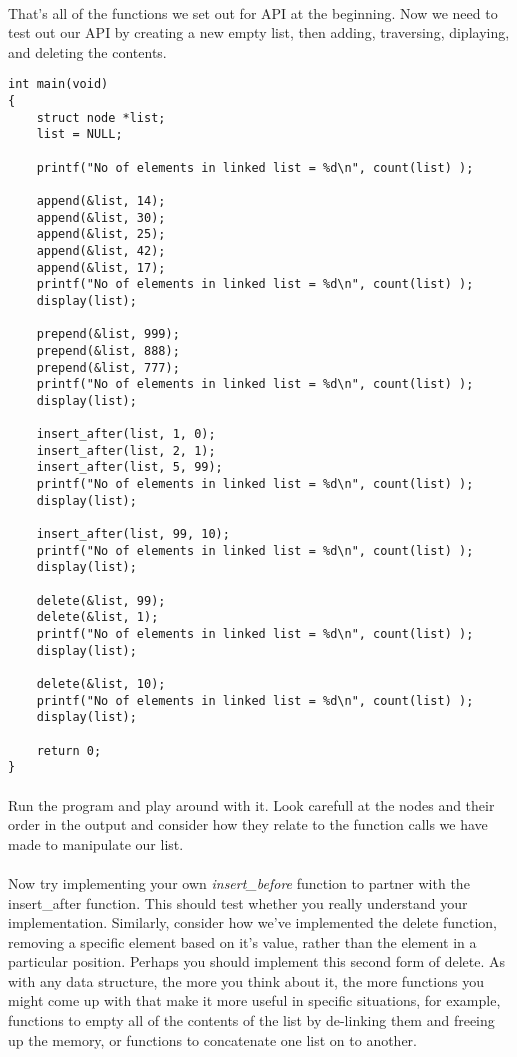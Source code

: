 \documentclass[10pt, a4paper, twosize]{article}
\begin{document}
\paragraph{} That's all of the functions we set out for API at the beginning. Now we need to test out our API by creating a new empty list, then adding, traversing, diplaying, and deleting the contents.
\begin{lstlisting}
int main(void)
{
    struct node *list;
    list = NULL;
    
    printf("No of elements in linked list = %d\n", count(list) );

    append(&list, 14);
    append(&list, 30);
    append(&list, 25);
    append(&list, 42);
    append(&list, 17);
    printf("No of elements in linked list = %d\n", count(list) );
    display(list);

    prepend(&list, 999);
    prepend(&list, 888);
    prepend(&list, 777);
    printf("No of elements in linked list = %d\n", count(list) );
    display(list);

    insert_after(list, 1, 0);
    insert_after(list, 2, 1);
    insert_after(list, 5, 99);
    printf("No of elements in linked list = %d\n", count(list) );
    display(list);

    insert_after(list, 99, 10);
    printf("No of elements in linked list = %d\n", count(list) );
    display(list);

    delete(&list, 99);
    delete(&list, 1);
    printf("No of elements in linked list = %d\n", count(list) );
    display(list);

    delete(&list, 10);
    printf("No of elements in linked list = %d\n", count(list) );
    display(list);

    return 0;
}
\end{lstlisting}
\paragraph{} Run the program and play around with it. Look carefull at the nodes and their order in the output and consider how they relate to the function calls we have made to manipulate our list.


\paragraph{} Now try implementing your own \emph{insert\_before} function to partner with the insert\_after function. This should test whether you really understand your implementation. Similarly, consider how we've implemented the delete function, removing a specific element based on it's value, rather than the element in a particular position. Perhaps you should implement this second form of delete. As with any data structure, the more you think about it, the more functions you might come up with that make it more useful in specific situations, for example, functions to empty all of the contents of the list by de-linking them and freeing up the memory, or functions to concatenate one list on to another.
\end{document}
